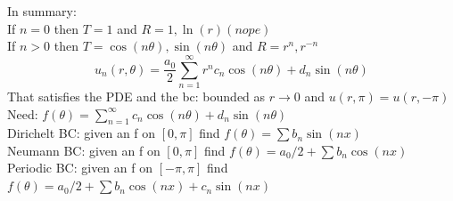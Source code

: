 \documentclass{article}
\begin{document}
In summary:\\
If $n = 0$ then $T = 1$ and $R = 1, \ln(r) (nope)$\\
If $n > 0$ then $T = \cos(n\theta), \sin(n\theta)$ and $R = r^n, r^{-n}$\\
$$ u_n(r,\theta) =  \frac{a_0}{2}\sum_{n=1}^{\infty} r^n c_n \cos(n\theta) + d_n \sin(n\theta)$$
That satisfies the PDE and the bc: bounded as $r \to 0$ and $u(r,\pi) = u(r,-\pi)$\\ 
Need: $ f(\theta) = \sum_{n=1}^{\infty} c_n \cos(n\theta) + d_n \sin(n\theta)$\\
Dirichelt BC: given an f on $[0,\pi]$ find $f(\theta) = \sum b_n \sin(nx)$\\
Neumann BC: given an f on $[0,\pi]$ find $f(\theta) = a_0/2 + \sum b_n \cos(nx)$\\
Periodic BC: given an f on $[-\pi, \pi]$ find $f(\theta) = a_0/2 +\sum b_n \cos(nx) + c_n \sin(nx)$\\
\end{document}
